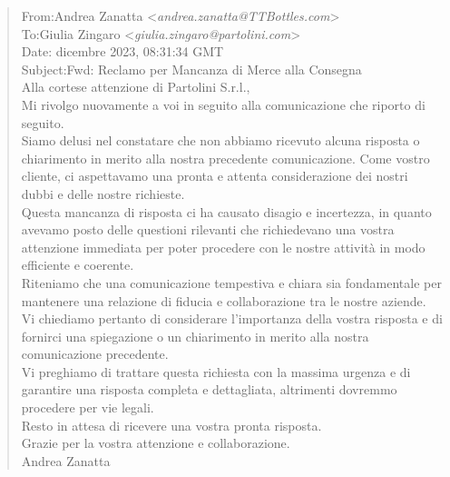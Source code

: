 \footnotesize
\begin{tcolorbox}[colback=gray!20, colframe=gray!50,sharp corners=southwest]
\begin{quote}
From:\qquad Andrea Zanatta <\textit{andrea.zanatta@TTBottles.com}>\\
To:\qquad Giulia Zingaro <\textit{giulia.zingaro@partolini.com}>\\
Date: dicembre 2023, 08:31:34 GMT\\
Subject:\qquad Fwd: Reclamo per Mancanza di Merce alla Consegna\vspace{14pt}\\
Alla cortese attenzione di Partolini S.r.l.,\vspace{14pt}\\
Mi rivolgo nuovamente a voi in seguito alla comunicazione che riporto di seguito.\vspace{14pt}\\
Siamo delusi nel constatare che non abbiamo ricevuto alcuna risposta o chiarimento in merito alla nostra precedente comunicazione. Come vostro cliente, ci aspettavamo una pronta e attenta considerazione dei nostri dubbi e delle nostre richieste.\vspace{14pt}\\
Questa mancanza di risposta ci ha causato disagio e incertezza, in quanto avevamo posto delle questioni rilevanti che richiedevano una vostra attenzione immediata per poter procedere con le nostre attività in modo efficiente e coerente.\vspace{14pt}\\
Riteniamo che una comunicazione tempestiva e chiara sia fondamentale per mantenere una relazione di fiducia e collaborazione tra le nostre aziende. Vi chiediamo pertanto di considerare l'importanza della vostra risposta e di fornirci una spiegazione o un chiarimento in merito alla nostra comunicazione precedente.\vspace{14pt}\\
Vi preghiamo di trattare questa richiesta con la massima urgenza e di garantire una risposta completa e dettagliata, altrimenti dovremmo procedere per vie legali.\vspace{14pt}\\
Resto in attesa di ricevere una vostra pronta risposta.\vspace{14pt}\\
Grazie per la vostra attenzione e collaborazione.\vspace{14pt}\\
Andrea Zanatta\vspace{14pt}\\

\end{quote}
\end{tcolorbox}
